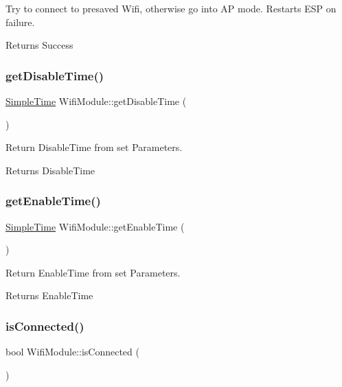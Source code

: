 Try to connect to presaved Wifi, otherwise go into AP mode. Restarts E\+SP on failure. \begin{DoxyReturn}{Returns}
Success 
\end{DoxyReturn}
\mbox{\label{class_wifi_module_ae43e1f85630c40920fa87c12de0d8e1e}} 
\subsubsection{\texorpdfstring{getDisableTime()}{getDisableTime()}}
{\footnotesize\ttfamily \mbox{\hyperlink{class_simple_time}{Simple\+Time}} Wifi\+Module\+::get\+Disable\+Time (\begin{DoxyParamCaption}{ }\end{DoxyParamCaption})}

Return Disable\+Time from set Parameters. \begin{DoxyReturn}{Returns}
Disable\+Time 
\end{DoxyReturn}
\mbox{\label{class_wifi_module_a1082a8799fe84e825520a61ee048da46}} 
\subsubsection{\texorpdfstring{getEnableTime()}{getEnableTime()}}
{\footnotesize\ttfamily \mbox{\hyperlink{class_simple_time}{Simple\+Time}} Wifi\+Module\+::get\+Enable\+Time (\begin{DoxyParamCaption}{ }\end{DoxyParamCaption})}

Return Enable\+Time from set Parameters. \begin{DoxyReturn}{Returns}
Enable\+Time 
\end{DoxyReturn}
\mbox{\label{class_wifi_module_a0f9b83f8ed9714183df33e055323261f}} 
\subsubsection{\texorpdfstring{isConnected()}{isConnected()}}
{\footnotesize\ttfamily bool Wifi\+Module\+::is\+Connected (\begin{DoxyParamCaption}{ }\end{DoxyParamCaption})}

